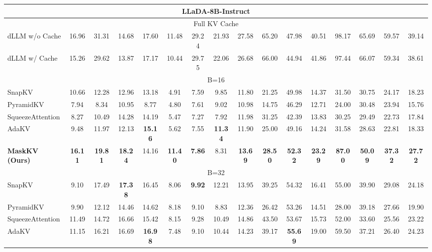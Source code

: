 \begin{table*}[t!]
{\begin{tabular}{@{}l*{15}{c}@{}}
        \midrule
        \multicolumn{16}{c}{\large \textbf{LLaDA-8B-Instruct}} \\
        \midrule
        \multicolumn{16}{c}{\small Full KV Cache} \\
        \midrule
        dLLM w/o Cache & 16.96 & 31.31 & 14.68 & 17.60 & 11.48 & 29.24 & 21.93 & 27.58 & 65.20 & 47.98 & 40.51 & 98.17 & 65.69 & 59.57 & 39.14 \\
        dLLM w/ Cache & 15.26 & 29.62 & 13.87 & 17.17 & 10.44 & 29.75 & 22.06 & 26.68 & 66.00 & 44.94 & 41.86 & 97.44 & 66.07 & 59.34 & 38.61 \\
        \midrule
        \multicolumn{16}{c}{\small B=16} \\
        \midrule
        SnapKV & 10.66 & 12.28 & 12.96 & 13.18 & 4.91 & 7.59 & 9.85 & 11.80 & 21.25 & 49.98 & 14.37 & 31.50 & 30.75 & 24.17 & 18.23 \\
        PyramidKV & 7.94 & 8.34 & 10.95 & 8.77 & 4.80 & 7.61 & 9.02 & 10.98 & 14.75 & 46.29 & 12.71 & 24.00 & 30.48 & 23.94 & 15.76 \\
        SqueezeAttention & 8.27 & 10.49 & 14.28 & 14.19 & 5.47 & 7.27 & 7.92 & 11.98 & 31.25 & 42.39 & 13.83 & 30.25 & 29.49 & 22.73 & 17.84 \\
        AdaKV & 9.48 & 11.97 & 12.13 & \textbf{15.16} & 5.62 & 7.55 & \textbf{11.34} & 11.90 & 25.00 & 49.16 & 14.24 & 31.58 & 28.63 & 22.81 & 18.33 \\
        \rowcolor{lightgreen} \textbf{MaskKV (Ours)} & \textbf{16.11} & \textbf{19.81} & \textbf{18.24} & 14.16 & \textbf{11.40} & \textbf{7.86} & 8.31 & \textbf{13.69} & \textbf{28.50} & \textbf{52.32} & \textbf{23.29} & \textbf{87.00} & \textbf{50.09} & \textbf{37.32} & \textbf{27.72} \\
        \midrule
        \multicolumn{16}{c}{\small B=32} \\
        \midrule
        SnapKV & 9.10 & 17.49 & \textbf{17.38} & 16.45 & 8.06 & \textbf{9.92} & 12.21 & 13.95 & 39.25 & 54.32 & 16.41 & 55.00 & 39.90 & 29.08 & 24.18 \\
        PyramidKV & 9.90 & 12.12 & 14.46 & 14.62 & 8.18 & 9.10 & 8.83 & 12.36 & 26.42 & 53.26 & 14.51 & 28.00 & 39.18 & 27.66 & 19.90 \\
        SqueezeAttention & 11.49 & 14.72 & 16.66 & 15.42 & 8.15 & 9.28 & 10.49 & 14.86 & 43.50 & 53.67 & 15.73 & 52.00 & 33.60 & 25.56 & 23.22 \\
        AdaKV & 11.15 & 16.21 & 16.69 & \textbf{16.98} & 7.48 & 9.10 & 10.44 & 14.23 & 39.17 & \textbf{55.69} & 19.00 & 59.50 & 37.21 & 26.40 & 24.23 \\

\end{tabular}}
\end{table*}
